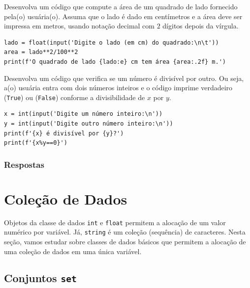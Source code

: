 \begin{exer}
  Desenvolva um código que compute a área de um quadrado de lado fornecido pela(o) usuária(o). Assuma que o lado é dado em centímetros e a área deve ser impressa em metros, usando notação decimal com $2$ dígitos depois da vírgula.
\end{exer}
\begin{resp}

\begin{lstlisting}
lado = float(input('Digite o lado (em cm) do quadrado:\n\t'))
area = lado**2/100**2
print(f'O quadrado de lado {lado:e} cm tem área {area:.2f} m.')
\end{lstlisting}

\end{resp}

\begin{exer}
  Desenvolva um código que verifica se um número é divisível por outro. Ou seja, a(o) usuária entra com dois números inteiros e o código imprime verdadeiro (\lstinline+True+) ou (\lstinline+False+) conforme a divisibilidade de $x$ por $y$.
\end{exer}
\begin{resp}

\begin{lstlisting}
x = int(input('Digite um número inteiro:\n'))
y = int(input('Digite outro número inteiro:\n'))
print(f'{x} é divisível por {y}?')
print(f'{x%y==0}')
\end{lstlisting}

\end{resp}

\ifisbook
\subsubsection{Respostas}
\shipoutAnswer
\fi


\section{Coleção de Dados}\label{cap_lingua_sec_colecao}

Objetos da classe de dados \lstinline+int+ e \lstinline+float+ permitem a alocação de um valor numérico por variável. Já, \lstinline+string+ é um coleção (sequência) de caracteres. Nesta seção, vamos estudar sobre classes de dados básicos que permitem a alocação de uma coleção de dados em uma única variável.

\subsection{Conjuntos \texttt{set}}

